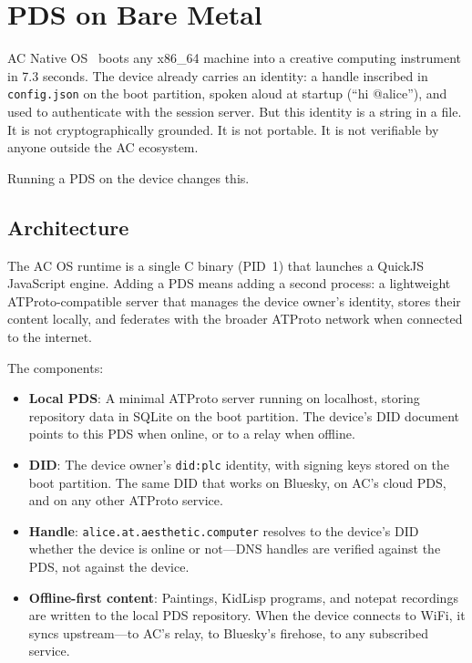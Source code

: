 \documentclass[10pt,letterpaper,twocolumn]{article}
\begin{document}
\section{PDS on Bare Metal}
\label{sec:pds-os}

AC Native OS~\citep{scudder2026os} boots any x86\_64 machine into a creative computing instrument in 7.3 seconds. The device already carries an identity: a handle inscribed in \texttt{config.json} on the boot partition, spoken aloud at startup (``hi @alice''), and used to authenticate with the session server. But this identity is a string in a file. It is not cryptographically grounded. It is not portable. It is not verifiable by anyone outside the AC ecosystem.

Running a PDS on the device changes this.

\subsection{Architecture}

The AC OS runtime is a single C binary (PID~1) that launches a QuickJS JavaScript engine. Adding a PDS means adding a second process: a lightweight ATProto-compatible server that manages the device owner's identity, stores their content locally, and federates with the broader ATProto network when connected to the internet.

The components:

\begin{itemize}
  \item \textbf{Local PDS}: A minimal ATProto server running on localhost, storing repository data in SQLite on the boot partition. The device's DID document points to this PDS when online, or to a relay when offline.
  \item \textbf{DID}: The device owner's \texttt{did:plc} identity, with signing keys stored on the boot partition. The same DID that works on Bluesky, on AC's cloud PDS, and on any other ATProto service.
  \item \textbf{Handle}: \texttt{alice.at.aesthetic.computer} resolves to the device's DID whether the device is online or not---DNS handles are verified against the PDS, not against the device.
  \item \textbf{Offline-first content}: Paintings, KidLisp programs, and notepat recordings are written to the local PDS repository. When the device connects to WiFi, it syncs upstream---to AC's relay, to Bluesky's firehose, to any subscribed service.
\end{itemize}
\end{document}
